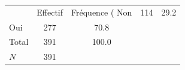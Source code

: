 {
\def\sym#1{\ifmmode^{#1}\else\(^{#1}\)\fi}
\begin{tabular}{l*{1}{cc}}
\toprule
            &    Effectif&Fréquence (%
\midrule
Non         &         114&        29.2\\
Oui         &         277&        70.8\\
Total       &         391&       100.0\\
\midrule
\(N\)       &         391&            \\
\bottomrule
\end{tabular}
}
